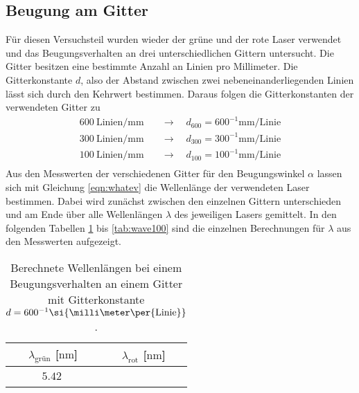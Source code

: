 \subsection{Beugung am Gitter}
Für diesen Versuchsteil wurden wieder der grüne und der rote Laser verwendet und das Beugungsverhalten an drei unterschiedlichen Gittern untersucht. Die Gitter besitzen
eine bestimmte Anzahl an Linien pro Millimeter. Die Gitterkonstante $d$, also der Abstand zwischen zwei nebeneinanderliegenden Linien lässt sich durch den Kehrwert bestimmen. 
Daraus folgen die Gitterkonstanten der verwendeten Gitter zu
\begin{align*}
\SI{600}{{\text{Linien}}\per\milli\meter} \quad &\to \quad d_{600} = {600^{-1}}\si{\milli\meter\per{\text{Linie}}} \\
\SI{300}{{\text{Linien}}\per\milli\meter} \quad &\to \quad d_{300} = {300^{-1}}\si{\milli\meter\per{\text{Linie}}} \\
\SI{100}{{\text{Linien}}\per\milli\meter} \quad &\to \quad d_{100} = {100^{-1}}\si{\milli\meter\per{\text{Linie}}} \\
\end{align*}
Aus den Messwerten der verschiedenen Gitter für den Beugungswinkel $\alpha$ lassen sich mit Gleichung \ref{eqn:whatev} die Wellenlänge der verwendeten Laser bestimmen.
Dabei wird zunächst zwischen den einzelnen Gittern unterschieden und am Ende über alle Wellenlängen $\lambda$ des jeweiligen Lasers gemittelt.
In den folgenden Tabellen \ref{tab:wave600} bis \ref{tab:wave100} sind die einzelnen Berechnungen für $\lambda$ aus den Messwerten aufgezeigt.

\begin{table}
    \centering
    \caption{Berechnete Wellenlängen bei einem Beugungsverhalten an einem Gitter mit Gitterkonstante $\protect d = {600^{-1}}\si{\milli\meter\per{\text{Linie}}}$.}
    \label{tab:wave600}
    \begin{tabular}{c c}
        \toprule
        $\lambda_{\text{grün}}$ [$\si{\nano\meter}$] & $\lambda_{\text{rot}}$ [$\si{\nano\meter}$] \\
        \midrule
        $\SI{5.42}{}$ & ~ \\
        \bottomrule    
    \end{tabular}
\end{table}

